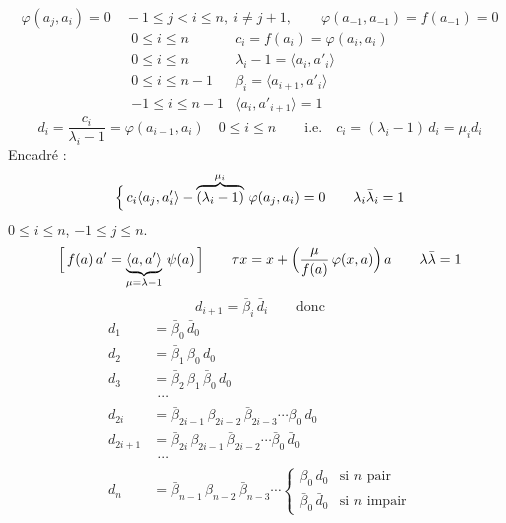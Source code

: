 \documentclass[11pt,a4paper]{article}
\begin{document}

\[
\varphi(a_j, a_i) = 0 \quad -1 \leq j < i \leq n,\ i \neq j+1, \qquad \varphi(a_{-1}, a_{-1}) = f(a_{-1}) = 0
\]
\[
\begin{array}{ll}
0 \leq i \leq n & c_i = f(a_i) = \varphi(a_i, a_i)\\
0 \leq i \leq n & \lambda_i - 1 = \langle a_i, a'_i\rangle\\
0 \leq i \leq n-1 & \beta_i = \langle a_{i+1}, a'_i\rangle\\
-1 \leq i \leq n-1 & \langle a_i, a'_{i+1}\rangle = 1
\end{array}
\]
\[
d_i = \frac{c_i}{\lambda_i - 1} = \varphi(a_{i-1}, a_i) \quad 0 \leq i \leq n \qquad \text{i.e.}\quad c_i = (\lambda_i - 1)\,d_i = \mu_i d_i
\]
Encadré :
\[
\Bigl\lbrace\, c_i \langle a_j, a'_i\rangle - \overbrace{(\lambda_i - 1)}^{\mu_i}\,\varphi(a_j, a_i) = 0 \qquad \lambda_i\bar{\lambda}_i = 1
\]
$0 \leq i \leq n$, $-1 \leq j \leq n$.
\[
\Bigl[\, f(a)\,a' = \underbrace{\langle a, a'\rangle}_{\mu = \lambda - 1}\,\psi(a) \,\Bigr]
\qquad
\tau x = x + \Bigl(\frac{\mu}{f(a)}\,\varphi(x, a)\Bigr)\,a \qquad \lambda\bar{\lambda} = 1
\]
\[
d_{i+1} = \bar{\beta}_i\,\bar{d}_i \qquad \text{donc}
\]
\[
\begin{aligned}
d_1 &= \bar{\beta}_0\,\bar{d}_0\\
d_2 &= \bar{\beta}_1\,\beta_0\,d_0\\
d_3 &= \bar{\beta}_2\,\beta_1\,\bar{\beta}_0\,d_0\\
&\ \,\cdots\\
d_{2i} &= \bar{\beta}_{2i-1}\,\beta_{2i-2}\,\bar{\beta}_{2i-3}\cdots\beta_0\,d_0\\
d_{2i+1} &= \bar{\beta}_{2i}\,\beta_{2i-1}\,\bar{\beta}_{2i-2}\cdots\bar{\beta}_0\,\bar{d}_0\\
&\ \,\cdots\\
d_n &= \bar{\beta}_{n-1}\,\beta_{n-2}\,\bar{\beta}_{n-3}\cdots \begin{cases}\beta_0\,d_0 & \text{si } n \text{ pair}\\ \bar{\beta}_0\,\bar{d}_0 & \text{si } n \text{ impair}\end{cases}
\end{aligned}
\]
\end{document}

